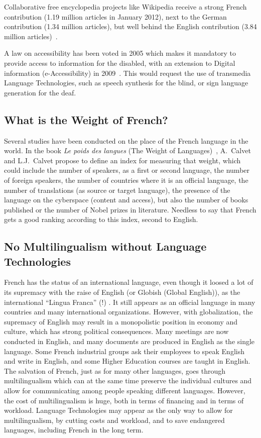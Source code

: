\begin{multicols}{2}
Collaborative free encyclopedia projects like Wikipedia receive a
strong French contribution (1.19 million articles in January 2012),
next to the German contribution (1.34 million articles), but well behind the English contribution (3.84 million articles)~\cite{wikipediastats}.

A law on accessibility has been voted in 2005 which makes it mandatory
to provide access to information for the disabled, with an extension
to Digital information (e-Accessibility) in 2009~\cite{loi}. This would request
the use of transmedia Language Technologies, such as speech synthesis
for the blind, or sign language generation for the deaf.

\subsection{What is the Weight of French?}

Several studies have been conducted on the place of the French
language in the world. In the book {\em Le poids des
langues} (The Weight of Languages)~\cite{calvet09}, A.~Calvet and
L.J.~Calvet propose to define an index for measuring that weight,
which could include the number of speakers, as a first or second
language, the number of foreign speakers, the number of countries
where it is an official language, the number of translations (as
source or target language), the presence of the language on the
cyberspace (content and access), but also the number of books
published or the number of Nobel prizes in literature. Needless to say
that French gets a good ranking according to this index, second to
English.

\subsection{No Multilingualism without Language Technologies}

French has the status of an international language, even though it
loosed a lot of its supremacy with the raise of English (or Globish
(Global English)), as the international ``Lingua Franca'' (!) \cite{ostler2010}. It still
appears as an official language in many countries and many
international organizations. However, with globalization, the
supremacy of English may result in a monopolistic position in economy
and culture, which has strong political consequences. Many meetings
are now conducted in English, and many documents are produced in
English as the single language. Some French industrial groups ask
their employees to speak English and write in English, and some Higher
Education courses are taught in English. The salvation of French, just
as for many other languages, goes through multilingualism which can at
the same time preserve the individual cultures and allow for
communicating among people speaking different languages. However, the
cost of multilingualism is huge, both in terms of financing and in
terms of workload. Language Technologies may appear as the only way to
allow for multilingualism, by cutting costs and workload, and to save
endangered languages, including French in the long term.


\end{multicols}
